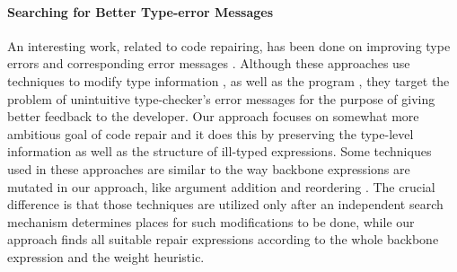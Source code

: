 \paragraph{{\bf Searching for Better Type-error Messages}}
An interesting work, related to code repairing, has been done on improving type
errors and corresponding error messages
\cite{McAdam01repairingtype,Lerner:2006:SSM:1159876.1159887,Lerner:2007:STM:1250734.1250783}.
Although these approaches use techniques
to modify type information \cite{McAdam01repairingtype}, as well as the program
\cite{Lerner:2007:STM:1250734.1250783}, they target the problem of
unintuitive type-checker's error messages for the purpose of giving better feedback to the developer.
Our approach focuses on somewhat more ambitious goal of code repair and it does
this by preserving the type-level information as well as the structure of
ill-typed expressions.
Some techniques used in these approaches are similar to the way backbone
expressions are mutated in our approach, like argument addition and reordering
\cite{Lerner:2007:STM:1250734.1250783}.
The crucial difference is that those techniques are utilized only after an
independent search mechanism determines places for such modifications to be
done, while our approach finds all suitable repair expressions according
to the whole backbone expression and the weight heuristic.






\cite{Tansalarak06xsnippet:XSnippet}


\cite{Chatterjee:2009:Sniff}



